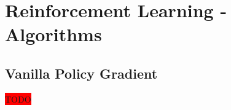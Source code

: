 \section{Reinforcement Learning - Algorithms}
\subsection{Vanilla Policy Gradient}
\colorbox{red}{TODO}
